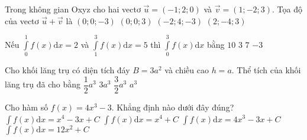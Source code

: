 \begin{ex}%
Trong không gian Oxyz cho hai vectơ $\vec{u}=(-1; 2; 0)$ và $\vec{v}= (1;-2; 3)$. Tọa độ của vectơ $\vec{u}+\vec{v}$ là
\choice
{$(0; 0;-3)$}
{\True $(0; 0; 3)$}
{$(-2; 4;-3)$}
{$(2;-4; 3)$}

\end{ex}
\begin{ex}%
Nếu $\displaystyle\int\limits_0^1 f(x) \mathrm{d} x=2$ và $\displaystyle\int\limits_1^3 f(x) \mathrm{d} x=5$ thì $\displaystyle\int\limits_0^3 f(x) \mathrm{d} x$ bằng
\choice
{$10$}
{$3$}
{\True $7$}
{$-3$}

\end{ex}
\begin{ex}%
Cho khối lăng trụ có diện tích đáy $B=3 a^2$ và chiều cao $h=a$. Thể tích của khối lăng trụ đã cho bằng
\choice
{$\dfrac{1}{2} a^3$}
{\True $3 a^3$}
{$\dfrac{3}{2} a^3$}
{$a^3$}

\end{ex}
\begin{ex}%
Cho hàm số $f(x)=4 x^3-3$. Khẳng định nào dưới đây đúng?
\choice
{\True $\displaystyle\int f(x) \mathrm{d} x=x^4-3 x+C$}
{$\displaystyle\int f(x) \mathrm{d} x=x^4+C$}
{$\displaystyle\int f(x) \mathrm{d} x=4 x^3-3 x+C$}
{$\displaystyle\int f(x) \mathrm{d} x=12 x^2+C$}

\end{ex}

